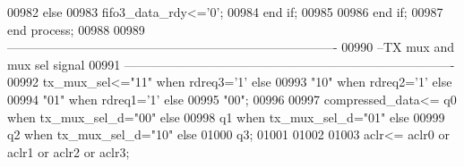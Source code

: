 \begin{DoxyCode}
00982         \textcolor{keywordflow}{else} 
00983             \textcolor{vhdlchar}{fifo3_data_rdy}\textcolor{vhdlchar}{<=}\textcolor{vhdlchar}{'}\textcolor{vhdllogic}{}\textcolor{vhdllogic}{0}\textcolor{vhdlchar}{'};
00984         \textcolor{keywordflow}{end} \textcolor{keywordflow}{if};
00985           
00986         \textcolor{keywordflow}{end} \textcolor{keywordflow}{if};
00987     \textcolor{keywordflow}{end} \textcolor{keywordflow}{process};
00988      
00989 \textcolor{keyword}{-------------------------------------------------------------------------------}
00990 \textcolor{keyword}{--TX mux and mux sel signal}
00991 \textcolor{keyword}{-------------------------------------------------------------------------------  }
00992    \textcolor{vhdlchar}{tx_mux_sel}\textcolor{vhdlchar}{<=}\textcolor{vhdllogic}{"11"} \textcolor{keywordflow}{when}   \textcolor{vhdlchar}{rdreq3}\textcolor{vhdlchar}{=}\textcolor{vhdlchar}{'}\textcolor{vhdllogic}{}\textcolor{vhdllogic}{1}\textcolor{vhdlchar}{'} \textcolor{keywordflow}{else}
00993                     \textcolor{vhdllogic}{"10"} \textcolor{keywordflow}{when}   \textcolor{vhdlchar}{rdreq2}\textcolor{vhdlchar}{=}\textcolor{vhdlchar}{'}\textcolor{vhdllogic}{}\textcolor{vhdllogic}{1}\textcolor{vhdlchar}{'} \textcolor{keywordflow}{else}                         
00994                \textcolor{vhdllogic}{"01"} \textcolor{keywordflow}{when}    \textcolor{vhdlchar}{rdreq1}\textcolor{vhdlchar}{=}\textcolor{vhdlchar}{'}\textcolor{vhdllogic}{}\textcolor{vhdllogic}{1}\textcolor{vhdlchar}{'} \textcolor{keywordflow}{else}
00995                \textcolor{vhdllogic}{"00"};
00996               
00997     \textcolor{vhdlchar}{compressed_data}\textcolor{vhdlchar}{<=} \textcolor{vhdlchar}{q0} \textcolor{keywordflow}{when} \textcolor{vhdlchar}{tx_mux_sel_d}\textcolor{vhdlchar}{=}\textcolor{vhdllogic}{"00"} \textcolor{keywordflow}{else}
00998                 \textcolor{vhdlchar}{q1} \textcolor{keywordflow}{when} \textcolor{vhdlchar}{tx_mux_sel_d}\textcolor{vhdlchar}{=}\textcolor{vhdllogic}{"01"} \textcolor{keywordflow}{else}
00999                 \textcolor{vhdlchar}{q2} \textcolor{keywordflow}{when} \textcolor{vhdlchar}{tx_mux_sel_d}\textcolor{vhdlchar}{=}\textcolor{vhdllogic}{"10"} \textcolor{keywordflow}{else}
01000                 \textcolor{vhdlchar}{q3};
01001                       
01002                   
01003 \textcolor{vhdlchar}{aclr}\textcolor{vhdlchar}{<=} \textcolor{vhdlchar}{aclr0} \textcolor{keywordflow}{or} \textcolor{vhdlchar}{aclr1} \textcolor{keywordflow}{or} \textcolor{vhdlchar}{aclr2} \textcolor{keywordflow}{or} \textcolor{vhdlchar}{aclr3};

\end{DoxyCode}
